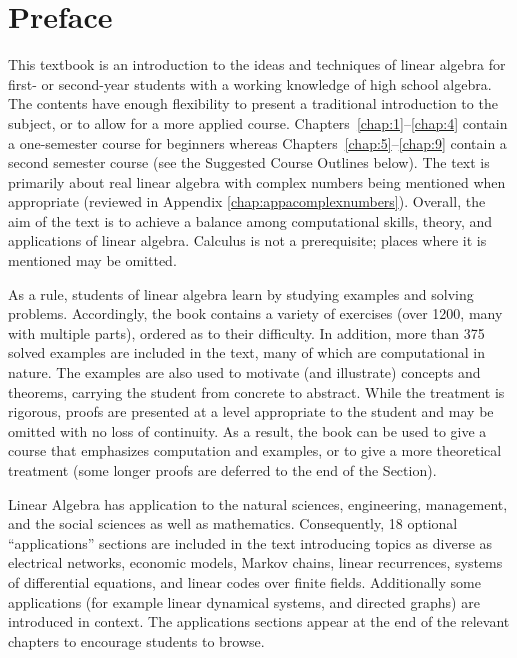 \chapter*{Preface}
\label{chap:preface}

This textbook is an introduction to the
 ideas and techniques of linear algebra for first- or second-year 
students with a working knowledge of high school algebra. The contents 
have enough flexibility to present a traditional introduction to the 
subject, or to allow for a more applied course. Chapters~\ref{chap:1}--\ref{chap:4} contain a one-semester course for beginners whereas Chapters~\ref{chap:5}--\ref{chap:9}
 contain a second semester course (see the Suggested Course Outlines 
below). The text is primarily about real linear algebra with complex 
numbers being mentioned when appropriate (reviewed in Appendix \ref{chap:appacomplexnumbers}).
 Overall, the aim of the text is to achieve a balance among 
computational skills, theory, and applications of linear algebra. 
Calculus is not a prerequisite; places where it is mentioned may be 
omitted.


As a rule, students of linear algebra 
learn by studying examples and solving problems. Accordingly, the book 
contains a variety of exercises (over 1200, many with multiple parts), 
ordered as to their difficulty. In addition, more than 375 solved 
examples are included in the text, many of which are computational in 
nature. The examples are also used to motivate (and illustrate) concepts
 and theorems, carrying the student from concrete to abstract. While the
 treatment is rigorous, proofs are presented at a level appropriate to 
the student and may be omitted with no loss of continuity. As a result, 
the book can be used to give a course that emphasizes computation and 
examples, or to give a more theoretical treatment (some longer proofs 
are deferred to the end of the Section).


Linear Algebra has application to the 
natural sciences, engineering, management, and the social sciences as 
well as mathematics. Consequently, 18 optional ``applications'' sections 
are included in the text introducing topics as diverse as electrical 
networks, economic models, Markov chains, linear recurrences, systems of
 differential equations, and linear codes over finite fields. 
Additionally some applications (for example linear dynamical systems, 
and directed graphs) are introduced in context. The applications 
sections appear at the end of the relevant chapters to encourage 
students to browse.


